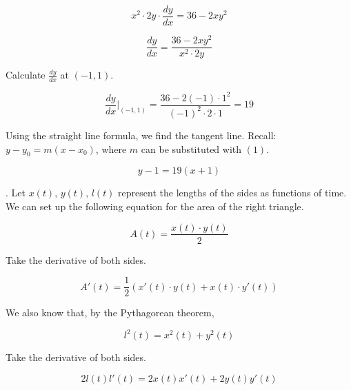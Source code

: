 \documentclass{article}
\begin{document}
\begin{equation*}x^2\cdot2y\cdot \frac{dy}{dx}=36 - 2xy^2\end{equation*}

\begin{equation*}\frac{dy}{dx}=\frac{36-2xy^2}{x^2\cdot2y}\end{equation*}

\hfill

\noindent Calculate $\displaystyle \frac{dy}{dx}$ at $(-1,1)$.

\hfill

\begin{equation}\frac{dy}{dx}\Bigg|_{(-1,1)}=\frac{36-2(-1)\cdot1^2}{(-1)^2\cdot2\cdot1} = 19\end{equation}

\hfill

\noindent Using the straight line formula, we find the tangent line. Recall: $y-y_0=m(x-x_0)$, where $m$ can be substituted with $(1)$.

\begin{equation*}\boxed{y-1=19(x+1)}\end{equation*}

\hfill

. Let $x(t),\,y(t),\,l(t)$ represent the lengths of the sides as functions of time. We can set up the following equation for the area of the right triangle.

\begin{equation*}A(t) = \frac{x(t)\cdot y(t)}{2}\end{equation*}

\hfill

\noindent Take the derivative of both sides.

\begin{equation}A'(t) =\frac12\left(x'(t)\cdot y(t) + x(t)\cdot y'(t) \right)\end{equation}

\hfill

\noindent We also know that, by the Pythagorean theorem,

\begin{equation*}l^2(t) = x^2(t)+y^2(t)\end{equation*}

\hfill

\noindent Take the derivative of both sides.

\begin{equation*}2l(t)l'(t)= 2x(t)x'(t)+2y(t)y'(t)\end{equation*}
\end{document}
